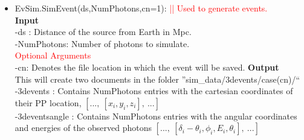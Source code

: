 \documentclass[article, superscriptaddress, ctexart, nofootinbib]{revtex4}
\newcommand{\tcr}{\textcolor{red}}
\begin{document}
\begin{itemize}
\item{EvSim.SimEvent(ds,NumPhotons,cn=1):   \tcr{|| Used to generate events.}} \\
 {\bf{Input}}\\
 -ds : Distance of the source from Earth in Mpc.\\
 -NumPhotons: Number of photons to simulate.\\
 \tcr{Optional Arguments}\\
 -cn: Denotes the file location in which the event will be saved.
 \newline
 {\bf{Output}}\\
 This will create two documents in the folder ''sim\_data/3devents/case(cn)/``\\
 -3devents : Contains NumPhotons entries with the cartesian coordinates of their PP location, $[...,~[x_i,y_i,z_i],~...]$\\
 -3deventsangle : Contains NumPhotons entries with the angular coordinates and energies of the observed photons
 $[...,~[\delta_i-\theta_i,\phi_i,E_i,\theta_i],~...]$\\


\end{itemize}
\end{document}
